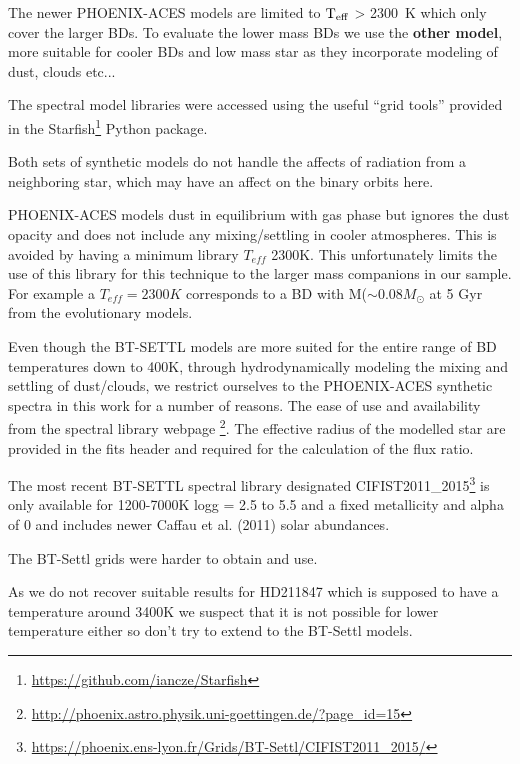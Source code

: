 The newer PHOENIX-ACES models are limited to \(\rm T_{eff} \) > 2300~K which only cover the larger BDs. To evaluate the lower mass BDs we use the \textbf{other model}, more suitable for cooler BDs and low mass star as they incorporate modeling of dust, clouds etc...


The spectral model libraries were accessed using the useful ``grid tools'' provided in the  Starfish\footnote{\url{https://github.com/iancze/Starfish}} Python package\citep{czekala_constructing_2015}.


Both sets of synthetic models do not handle the affects of radiation from a neighboring star, which may have an affect on the binary orbits here.



PHOENIX-ACES models dust in equilibrium with gas phase but ignores the dust opacity and does not include any mixing/settling in cooler atmospheres. This is avoided by having a minimum library \(T_{eff}\) 2300K. This unfortunately limits the use of this library for this technique to the larger mass companions in our sample. For example a \(T_{eff}=2300K\) corresponds to a BD with M(\(\sim0.08 M_{\odot}\) at 5 Gyr from the \cite{baraffe_evolutionary_2003} evolutionary models. 


Even though the BT-SETTL models are more suited for the entire range of BD temperatures down to 400K, through hydrodynamically modeling the mixing and settling of dust/clouds, we restrict ourselves to the PHOENIX-ACES synthetic spectra in this work for a number of reasons. The ease of use and availability from the spectral library webpage \footnote{\url{http://phoenix.astro.physik.uni-goettingen.de/?page_id=15}}. The effective radius of the modelled star are provided in the fits header and required for the calculation of the flux ratio.



The most recent BT-SETTL spectral library designated CIFIST2011\_2015\footnote{\url{https://phoenix.ens-lyon.fr/Grids/BT-Settl/CIFIST2011_2015/}} \cite{baraffe_new_2015} is only available for 1200-7000K logg = 2.5 to 5.5 and a fixed metallicity and alpha of 0 and includes newer Caffau et al. (2011) solar abundances.

The BT-Settl grids were harder to obtain and use.

As we do not recover suitable results for HD211847 which is supposed to have a temperature around 3400K we suspect that it is not possible for lower temperature either so don't try to extend to the BT-Settl models. 


